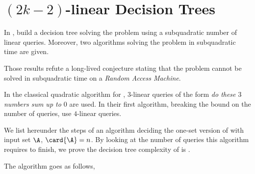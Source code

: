 \section{$(2k-2)$-linear Decision Trees}

In \cite{gronlund:2014}, \citeauthor{gronlund:2014} build a decision tree
solving the \threeSUM problem using a subquadratic number of linear queries.
Moreover, two algorithms solving the \threeSUM problem in subquadratic time are
given.

Those results refute a long-lived conjecture stating that the \threeSUM problem
cannot be solved in subquadratic time on a \emph{Random Access Machine}.

In the classical quadratic algorithm for \threeSUM, $3$-linear queries of the
form \emph{do these $3$ numbers sum up to $0$} are used. In their first
algorithm, breaking the  bound on the number of queries,
\citeauthor{gronlund:2014} use $4$-linear queries.

We list hereunder the steps of an algorithm deciding the one-set
version of \threeSUM with input set $\A$, $\card{\A} = n$. By looking at the
number of queries this algorithm requires to finish, we prove the
decision tree complexity of \threeSUM is .

The algorithm goes as follows,

